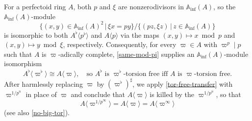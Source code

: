 \documentclass[11pt, reqno]{amsart}
\newcommand{\temp}[1]{{\color{Gray} {\footnotesize  #1 }}}			%
\newcommand{\bA}{\mathbb{A}}
\newcommand{\bF}{\mathbb{F}}
\newcommand{\Inf}{\mathrm{inf}}		%
\newcommand{\surjects}{\twoheadrightarrow}
\newcommand{\blem}{\begin{lemma}}
\newcommand{\elem}{\end{lemma}}
\providecommand{\qxq}[1]{\quad\text{#1}\quad}
\providecommand{\qx}[1]{\quad\text{#1}}
\newcommand{\be}{\begin{equation}}
\newcommand{\ee}{\end{equation}}
\newcommand{\bpf}{\begin{proof}}
\newcommand{\epf}{\end{proof}}
\numberwithin{equation}{numberingbase}
\theoremstyle{thms}
\newtheorem{lemma}[numberingbase]{Lemma}
\theoremstyle{claims}
\theoremstyle{defs}
\theoremstyle{thms}
\theoremstyle{defs}
\theoremstyle{subsection-tweak}
\newtheorem{pp}[numberingbase]{}
\newcommand{\bpp}{\begin{pp}}
\theoremstyle{subsection-tweak}
\begin{document}







For a perfectoid ring $A$, both $p$ and $\xi$ are nonzerodivisors in $\bA_\Inf(A)$, so the $\bA_\Inf(A)$-module
\[
\{(x, y) \in \bA_\Inf(A)^2 \, \vert\, \xi x = p y \}/ \{(pz, \xi z)\, \vert\, z \in \bA_\Inf(A)\}
\]
is isomorphic to both $A^\flat\langle p^\flat\rangle$ and $A\langle p\rangle$
via the maps $(x, y) \mapsto x \bmod p$ and $(x, y) \mapsto y \bmod \xi$, respectively. Consequently, for every $\varpi \in A$ with $\varpi^p \mid p$ such that $A$ is $\varpi$-adically complete, \eqref{same-mod-pi} supplies an $\bA_\Inf(A)$-module isomorphism 
\be \label{tor-free-transfer}
A^\flat\langle \varpi^\flat\rangle \cong A\langle\varpi\rangle, \qx{so $A^\flat$ is $\varpi^\flat$-torsion free iff $A$ is $\varpi$-torsion free.}
\ee
After harmlessly replacing $\varpi$ by $(\varpi^\flat)^\sharp$, we apply \eqref{tor-free-transfer} with $\varpi^{1/p^n}$ in place of $\varpi$ and conclude that $A\langle \varpi \rangle$ is killed by the $\varpi^{1/p^n}$, so that 
\[
A\langle \varpi^{1/p^\infty}\rangle = A\langle \varpi \rangle = A\langle \varpi^\infty \rangle
\]
(see also \eqref{no-big-tor}).
\end{document}
